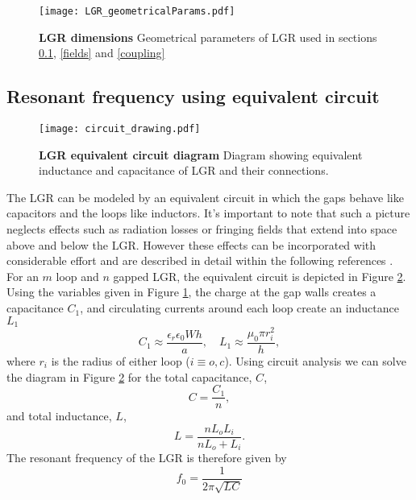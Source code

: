 \begin{figure}[h!]
\centering
\texttt{[image: LGR\_geometricalParams.pdf]}  
\caption{\textbf{LGR dimensions} Geometrical parameters of LGR used in sections \ref{circuit}, \ref{fields} and \ref{coupling}}
\label{LGR_geometry1}
\end{figure}


\subsection{Resonant frequency using equivalent circuit} \label{circuit}

\begin{figure}[t!]
\centering
\texttt{[image: circuit\_drawing.pdf]}  
\caption{\textbf{LGR equivalent circuit diagram} Diagram showing equivalent inductance and capacitance of LGR and their connections.}
\label{circuitdiagram}
\end{figure}

The LGR can be modeled by an equivalent circuit in which the gaps behave like capacitors and the loops like inductors. It's important to note that such a picture neglects effects such as radiation losses or fringing fields that extend into space above and below the LGR. However these effects can be incorporated with considerable effort and are described in detail within the following references \cite{mehdizadeh1983Loop, rinard2005loopgap, wood1984loop}. For an $m$ loop and $n$ gapped LGR, the equivalent circuit is depicted in Figure \ref{circuitdiagram}. Using the variables given in Figure \ref{LGR_geometry1}, the charge at the gap walls creates a capacitance $C_1$, and circulating currents around each loop create an inductance $L_1$
\begin{equation} \label{indcap}
C_1 \approx \frac{\epsilon_r \epsilon_0 W h}{a}, \quad L_1 \approx \frac{\mu_0 \pi r_i^2}{h}, 
\end{equation}
where $r_i$ is the radius of either loop ($i \equiv o,c$). Using circuit analysis we can solve the diagram in Figure \ref{circuitdiagram} for the total capacitance, $C$,
\begin{equation}\label{capacitance}
C = \frac{C_1}{n},
\end{equation} 
and total inductance, $L$,
\begin{equation}\label{inductance}
L = \frac{n L_o L_i}{n L_o + L_i}.
\end{equation}
The resonant frequency of the LGR is therefore given by 
\begin{equation}
f_0 = \frac{1}{2 \pi \sqrt{LC}}
\end{equation}


